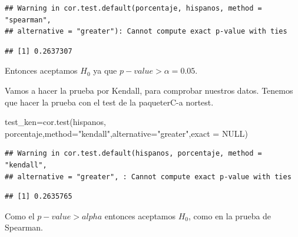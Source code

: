 \documentclass[
]{article}
\newenvironment{Shaded}{\begin{snugshade}}{\end{snugshade}}
\newcommand{\AttributeTok}[1]{\textcolor[rgb]{0.77,0.63,0.00}{#1}}
\newcommand{\ConstantTok}[1]{\textcolor[rgb]{0.00,0.00,0.00}{#1}}
\newcommand{\FunctionTok}[1]{\textcolor[rgb]{0.00,0.00,0.00}{#1}}
\newcommand{\NormalTok}[1]{#1}
\newcommand{\OtherTok}[1]{\textcolor[rgb]{0.56,0.35,0.01}{#1}}
\newcommand{\SpecialCharTok}[1]{\textcolor[rgb]{0.00,0.00,0.00}{#1}}
\newcommand{\StringTok}[1]{\textcolor[rgb]{0.31,0.60,0.02}{#1}}
\begin{document}
\begin{verbatim}
## Warning in cor.test.default(porcentaje, hispanos, method = "spearman",
## alternative = "greater"): Cannot compute exact p-value with ties
\end{verbatim}

\begin{Shaded}
\end{Shaded}

\begin{verbatim}
## [1] 0.2637307
\end{verbatim}

Entonces aceptamos \(H_{0}\) ya que \(p-value>\alpha= 0.05\).

Vamos a hacer la prueba por Kendall, para comprobar nuestros datos.
Tenemos que hacer la prueba con el test de la paqueterC-a nortest.

\begin{Shaded}
\begin{Highlighting}[]
\NormalTok{test\_ken}\OtherTok{=}\FunctionTok{cor.test}\NormalTok{(hispanos, porcentaje,}\AttributeTok{method=}\StringTok{"kendall"}\NormalTok{,}\AttributeTok{alternative=}\StringTok{"greater"}\NormalTok{,}\AttributeTok{exact =} \ConstantTok{NULL}\NormalTok{)}
\end{Highlighting}
\end{Shaded}

\begin{verbatim}
## Warning in cor.test.default(hispanos, porcentaje, method = "kendall",
## alternative = "greater", : Cannot compute exact p-value with ties
\end{verbatim}

\begin{Shaded}
\end{Shaded}

\begin{verbatim}
## [1] 0.2635765
\end{verbatim}

Como el \(p-value>alpha\) entonces aceptamos \(H_{0}\), como en la
prueba de Spearman.
\end{document}
